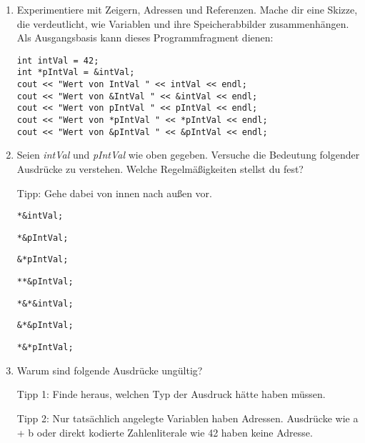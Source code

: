 \begin{enumerate}

\item Experimentiere mit Zeigern, Adressen und Referenzen.
Mache dir eine Skizze, die verdeutlicht, wie Variablen und ihre Speicherabbilder zusammenhängen.
Als Ausgangsbasis kann dieses Programmfragment dienen:
\begin{lstlisting}
int intVal = 42;
int *pIntVal = &intVal;
cout << "Wert von IntVal " << intVal << endl;
cout << "Wert von &IntVal " << &intVal << endl;
cout << "Wert von pIntVal " << pIntVal << endl;
cout << "Wert von *pIntVal " << *pIntVal << endl;
cout << "Wert von &pIntVal " << &pIntVal << endl;
\end{lstlisting}

\item Seien \emph{intVal} und \emph{pIntVal} wie oben gegeben.
Versuche die Bedeutung folgender Ausdrücke zu verstehen.
Welche Regelmäßigkeiten stellst du fest?

Tipp: Gehe dabei von innen nach außen vor.

\begin{lstlisting}
*&intVal;
\end{lstlisting}

\begin{lstlisting}
*&pIntVal;
\end{lstlisting}

\begin{lstlisting}
&*pIntVal;
\end{lstlisting}

\begin{lstlisting}
**&pIntVal;
\end{lstlisting}

\begin{lstlisting}
*&*&intVal;
\end{lstlisting}

\begin{lstlisting}
&*&pIntVal;
\end{lstlisting}

\begin{lstlisting}
*&*pIntVal;
\end{lstlisting}


\item Warum sind folgende Ausdrücke ungültig?

Tipp 1: Finde heraus, welchen Typ der Ausdruck hätte haben müssen.

Tipp 2: Nur tatsächlich angelegte Variablen haben Adressen. Ausdrücke wie a + b oder direkt kodierte Zahlenliterale wie 42 haben keine Adresse.


\end{enumerate}
